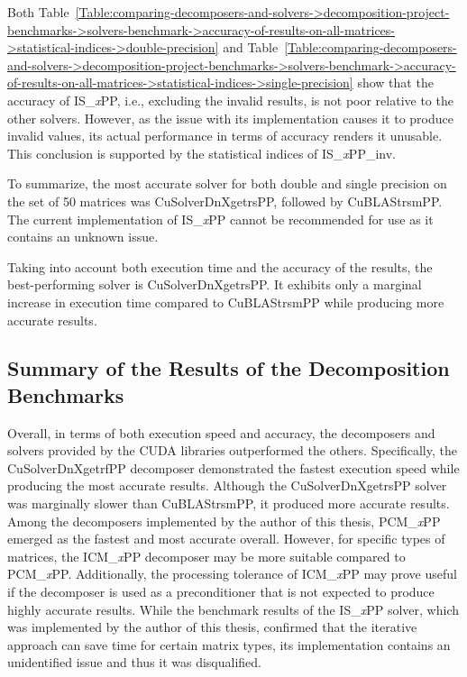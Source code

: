 Both Table~\ref{Table:comparing-decomposers-and-solvers->decomposition-project-benchmarks->solvers-benchmark->accuracy-of-results-on-all-matrices->statistical-indices->double-precision} and Table~\ref{Table:comparing-decomposers-and-solvers->decomposition-project-benchmarks->solvers-benchmark->accuracy-of-results-on-all-matrices->statistical-indices->single-precision} show that the accuracy of IS\_\textit{x}PP, i.e., excluding the invalid results, is not poor relative to the other solvers. However, as the issue with its implementation causes it to produce invalid values, its actual performance in terms of accuracy renders it unusable. This conclusion is supported by the statistical indices of IS\_\textit{x}PP\_inv.

To summarize, the most accurate solver for both double and single precision on the set of 50 matrices was CuSolverDnXgetrsPP, followed by CuBLAStrsmPP. The current implementation of IS\_\textit{x}PP cannot be recommended for use as it contains an unknown issue.

Taking into account both execution time and the accuracy of the results, the best-performing solver is CuSolverDnXgetrsPP. It exhibits only a marginal increase in execution time compared to CuBLAStrsmPP while producing more accurate results.

\subsection{Summary of the Results of the Decomposition Benchmarks}\label{Subsection:comparing-decomposers-and-solvers->decomposition-project-benchmarks->solvers-benchmark->summary-of-results-of-decomposition-benchmarks}
Overall, in terms of both execution speed and accuracy, the decomposers and solvers provided by the CUDA libraries outperformed the others. Specifically, the CuSolverDnXgetrfPP decomposer demonstrated the fastest execution speed while producing the most accurate results. Although the CuSolverDnXgetrsPP solver was marginally slower than CuBLAStrsmPP, it produced more accurate results. Among the decomposers implemented by the author of this thesis, PCM\_\textit{x}PP emerged as the fastest and most accurate overall. However, for specific types of matrices, the ICM\_\textit{x}PP decomposer may be more suitable compared to PCM\_\textit{x}PP. Additionally, the processing tolerance of ICM\_\textit{x}PP may prove useful if the decomposer is used as a preconditioner that is not expected to produce highly accurate results. While the benchmark results of the IS\_\textit{x}PP solver, which was implemented by the author of this thesis, confirmed that the iterative approach can save time for certain matrix types, its implementation contains an unidentified issue and thus it was disqualified.




